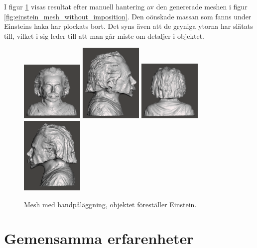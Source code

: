I figur \ref{fig:einstein_mesh_with_imposition} visas resultat efter manuell hantering av den genererade meshen i figur \ref{fig:einstein_mesh_without_imposition}. Den oönskade massan som fanns under Einsteins haka har plockats bort. Det syns även att de gryniga ytorna har slätats till, vilket i sig leder till att man går miste om detaljer i objektet.

\begin{figure}[H]
	\centering
	\includegraphics[width=30mm]{figures/ein_mesh_with_imposition1.png}
	\includegraphics[width=30mm]{figures/ein_mesh_with_imposition2.png}
	\includegraphics[width=30mm]{figures/ein_mesh_with_imposition3.png}
	\includegraphics[width=30mm]{figures/ein_mesh_with_imposition4.png}
	\caption{Mesh med handpåläggning, objektet föreställer Einstein.}
	\label{fig:einstein_mesh_with_imposition}
\end{figure}


\section{Gemensamma erfarenheter}
\label{cha:results_experiences}

